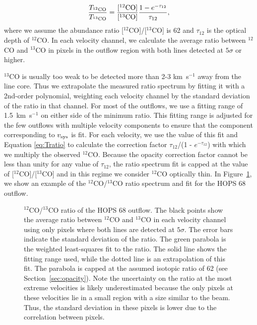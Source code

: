 \documentclass[twocolumn]{aastex63}
\newcommand{\example}{HOPS 68}
\newcommand{\kms}{km~s$^{-1}$}
\newcommand{\co}[1][]{\ensuremath{^{#1}}CO}
\begin{document}
\begin{equation}\label{eq:Tratio}
\frac{T_{\rm \co[12]}}{T_{\rm \co[13]}} = \frac{[\rm{\co[12]}]}{[\rm{\co[13]}]} \frac{1 - e^{-\tau_{12}}}{\tau_{12}},
\end{equation}
where we assume the abundance ratio [\co[12]]/[\co[13]] is 62 \citep{Langer93} and $\tau_{12}$ is the optical depth of \co[12]{}. In each velocity channel, we calculate the average ratio between \co[12]{} and \co[13]{} in pixels in the outflow region with both lines detected at $5\sigma$ or higher. 

\co[13]{} is usually too weak to be detected more than 2-3 \kms{} away from the line core. Thus we extrapolate the measured ratio spectrum by fitting it with a 2nd-order polynomial, weighting each velocity channel by the standard deviation of the ratio in that channel. For most of the outflows, we use a fitting range of 1.5~\kms{} on either side of the minimum ratio. This fitting range is adjusted for the few outflows with multiple velocity components to ensure that the component corresponding to $v_{\rm sys}$ is fit. For each velocity, we use the value of this fit and Equation \ref{eq:Tratio} to calculate the correction factor $\tau_{12}$/(1 - $e^{-\tau_{12}}$) with which we multiply the observed \co[12]{}. Because the opacity correction factor cannot be less than unity for any value of $\tau_{12}$, the ratio spectrum fit is capped at the value of [\co[12]]/[\co[13]] and in this regime we consider \co[12]{} optically thin. In Figure~\ref{fig:opacity}, we show an example of the \co[12]{}/\co[13]{} ratio spectrum and fit for the \example{} outflow. 

\begin{figure}
\caption{\co[12]{}/\co[13]{} ratio of the \example{} outflow. The black points show the average ratio between \co[12]{} and \co[13]{} in each velocity channel using only pixels where both lines are detected at $5\sigma$. The error bars indicate the standard deviation of the ratio. The green parabola is the weighted least-squares fit to the ratio. The solid line shows the fitting range used, while the dotted line is an extrapolation of this fit. The parabola is capped at the assumed isotopic ratio of 62 (see Section~\ref{sec:opacity}). Note the uncertainty on the ratio at the most extreme velocities is likely underestimated because the only pixels at these velocities lie in a small region with a size similar to the beam. Thus, the standard deviation in these pixels is lower due to the correlation between pixels.\label{fig:opacity}}
\end{figure}
\end{document}

